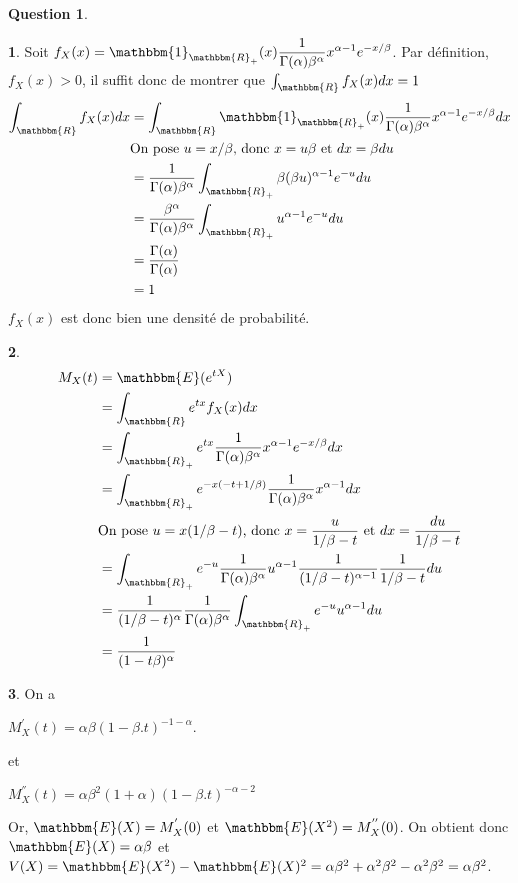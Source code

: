\documentclass[12pt]{article}
\newcommand{\R}{\mathbbm{R}}
\newcommand{\1}{\mathbbm{1}}
\newcommand{\E}{\mathbbm{E}}
\theoremstyle{definition}\newtheorem{defn}{Définition}
\theoremstyle{definition}\newtheorem{exm}{Exemple}
\theoremstyle{definition}\newtheorem{rem}{Remarque}
\theoremstyle{definition}\newtheorem{algo}{Algorithme}
\theoremstyle{remark}\newtheorem{exo}{Exercice}
\theoremstyle{remark}\newtheorem{nota}{Notation}
\theoremstyle{definition}\newtheorem{1q}{Question}
\theoremstyle{definition}\newtheorem{2q}{Question}
\theoremstyle{definition}\newtheorem{3q}{Question}
\theoremstyle{definition}\newtheorem{4q}{Question}
\theoremstyle{definition}\newtheorem{2qs1}{}
\theoremstyle{definition}\newtheorem{2qs2}{}
\theoremstyle{definition}\newtheorem{2qs3}{}
\theoremstyle{definition}\newtheorem{2qs4}{}
\theoremstyle{definition}\newtheorem{4qs2}{}
\theoremstyle{definition}\newtheorem{4qs3}{}
\begin{document}
\begin{2q}

\begin{2qs2}
Soit $\displaystyle f_X(x)=\1_{\R_+}(x)\frac{1}{\Gamma(\alpha)\beta^\alpha}x^{\alpha-1}e^{-x/\beta}$. Par définition, $f_X(x) >0$, il suffit donc de montrer que $\int_\R f_X(x)dx =1$
\begin{align*}
\int_\R f_X(x)dx &= \int_\R\1_{\R_+}(x)\frac{1}{\Gamma(\alpha)\beta^\alpha}x^{\alpha-1}e^{-x/\beta}dx \\
& \text{On pose $u=x/\beta$, donc $x=u\beta$ et $dx=\beta du$}\\
&=\frac{1}{\Gamma(\alpha)\beta^\alpha} \int_{\R_+}\beta(\beta u)^{\alpha-1}e^{-u}du\\
&= \frac{\beta^{\alpha}}{\Gamma(\alpha)\beta^\alpha} \int_{\R_+}u^{\alpha-1}e^{-u}du\\
&=\frac{\Gamma(\alpha)}{\Gamma(\alpha)}\\
&= 1
\end{align*}
$f_X(x)$ est donc bien une densité de probabilité.
\end{2qs2}

\begin{2qs2}
\begin{align*}
M_X(t) &= \E(e^{tX})\\
&= \int_\R e^{tx}f_X(x)dx\\
&=\int_{\R_+}e^{tx}\frac{1}{\Gamma(\alpha)\beta^\alpha}x^{\alpha-1}e^{-x/\beta}dx\\
&=\int_{\R_+}e^{-x(-t+1/\beta)}\frac{1}{\Gamma(\alpha)\beta^\alpha}x^{\alpha-1}dx\\
&\text{On pose $u=x(1/\beta -t)$, donc $x=\frac{u}{1/\beta-t}$ et $dx =\frac{du}{1/\beta -t}$}\\
&= \int_{\R_+}e^{-u}\frac{1}{\Gamma(\alpha)\beta^\alpha}u^{\alpha-1}\frac{1}{(1/\beta-t)^{\alpha-1}}\frac{1}{1/\beta - t}du\\
&= \frac{1}{(1/\beta-t)^\alpha}\frac{1}{\Gamma(\alpha)\beta^\alpha}\int_{\R_+}e^{-u}u^{\alpha-1}du\\
&= \frac{1}{(1-t\beta)^\alpha}
\end{align*}
\end{2qs2}

\begin{2qs2}
On a
\begin{center}$M_X^{'}(t) = \alpha\beta(1-\beta.t)^{-1-\alpha}$.\end{center}
et
\begin{center} $M_X^{''}(t) = \alpha\beta^2(1+\alpha)(1-\beta.t)^{-\alpha-2}$\end{center}
Or, $\E(X) = M_X^{'}(0)$ et $\E(X^2) = M_X^{''}(0)$.\newline
On obtient donc $\E(X) = \alpha\beta$ et \newline
 $V(X) = \E(X^2) - \E(X)^2 = \alpha\beta^2 + \alpha^2\beta^2 - \alpha^2\beta^2 = \alpha\beta^2$.
\end{2qs2}


\end{2q}
\end{document}
